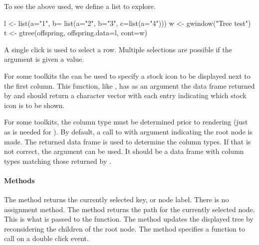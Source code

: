 To see the above used, we define a list to explore.
\begin{Schunk}
\begin{Sinput}
 l <- list(a="1", b= list(a="2", b="3", c=list(a="4")))
 w <- gwindow("Tree test")
 t <- gtree(offspring, offspring.data=l, cont=w)
\end{Sinput}
\end{Schunk}


A single click is used to select a row. Multiple selections are
possible if the  argument is given a
 value.

For some toolkits the  can be used to
specify a stock icon to be displayed next to the first column. This
function, like , has as an argument the data frame
returned by  and should return a character vector with
each entry indicating which stock icon is to be shown.

For some toolkits, the column type must be determined prior to
rendering (just as is needed for ). By default, a call to  with argument
 indicating the root node is made. The returned data frame
is used to determine the column types. If that is not correct, the
argument  can be used. It should be a data
frame with column types matching those returned by .

\paragraph{Methods}
The  method returns the currently selected key,
or node label. There is no assignment method. The \method{[}{gtree}
method returns the path for the currently selected node. This is what
is passed to the  function.  The
 method updates the displayed tree by
reconsidering the children of the root node.  The method
 specifies a function to call on
a double click event.

